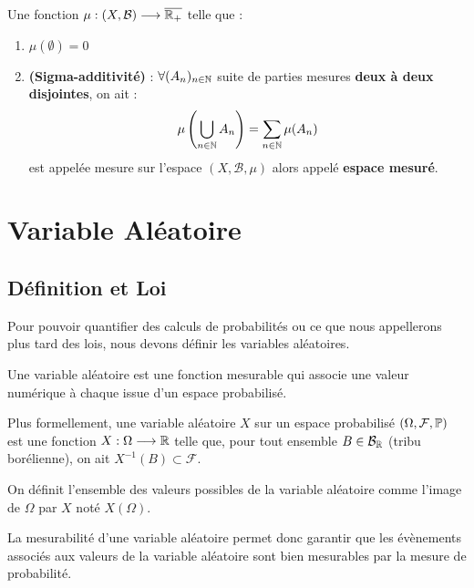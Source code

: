 \begin{remark}
    Une fonction $ \mu : (X, \mathcal{B}) \longrightarrow \overline{\mathbb{R}_+}$ telle que : 
    \begin{enumerate}
        \item $ \mu(\emptyset) = 0 $ 
        \item \textbf{(Sigma-additivité)} : $ \forall (A_n)_{n \in \mathbb{N}}$ suite de parties mesures \textbf{deux à deux disjointes}, on ait : 
            \[ \mu \left( \bigcup_{n \in \mathbb{N}} A_n \right) = \sum_{n \in \mathbb{N}} \mu(A_n) \]
        est appelée mesure sur l'espace $(X, \mathcal{B}, \mu)$ alors appelé \textbf{espace mesuré}. 
    \end{enumerate}
\end{remark}

\section{Variable Aléatoire}

\subsection{Définition et Loi}

Pour pouvoir quantifier des calculs de probabilités ou ce que nous appellerons plus tard des lois, nous devons définir 
les variables aléatoires. 

\begin{definition}
    Une variable aléatoire est une fonction mesurable qui associe une valeur numérique à chaque issue d'un espace probabilisé. 

    \vspace{0.5cm}

    Plus formellement, une variable aléatoire $X$ sur un espace probabilisé $(\Omega, \mathcal{F}, \mathbb{P})$ 
    est une fonction $ X : \Omega \longrightarrow \mathbb{R}$ telle que, pour tout ensemble $B \in \mathcal{B}_{\mathbb{R}}$ (tribu borélienne), 
    on ait $X^{-1} (B) \subset \mathcal{F}$. 

    \vspace{0.5cm}

    On définit l'ensemble des valeurs possibles de la variable aléatoire comme l'image de $\Omega$ par $X$ noté $X(\Omega)$. 
\end{definition}

La mesurabilité d'une variable aléatoire permet donc garantir que les évènements associés aux valeurs de la variable 
aléatoire sont bien mesurables par la mesure de probabilité. 

